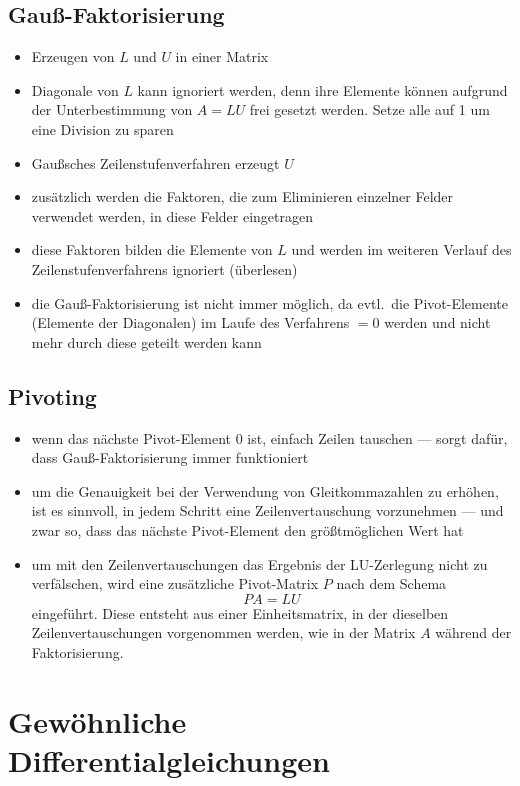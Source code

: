 \documentclass[a4paper, 12pt]{article}
\begin{document}
\subsection{Gauß-Faktorisierung}
\begin{itemize}
  \item Erzeugen von \(L\) und \(U\) in einer Matrix
  \item Diagonale von \(L\) kann ignoriert werden, denn ihre Elemente können aufgrund der Unterbestimmung von \(A=LU\) frei gesetzt werden. Setze alle auf 1 um eine Division zu sparen
  \item Gaußsches Zeilenstufenverfahren erzeugt \(U\)
  \item zusätzlich werden die Faktoren, die zum Eliminieren einzelner Felder verwendet werden, in diese Felder eingetragen
  \item diese Faktoren bilden die Elemente von \(L\) und werden im weiteren Verlauf des Zeilenstufenverfahrens ignoriert (überlesen)
  \item die Gauß-Faktorisierung ist nicht immer möglich, da evtl.\ die Pivot-Elemente (Elemente der Diagonalen) im Laufe des Verfahrens \(=0\) werden und nicht mehr durch diese geteilt werden kann
\end{itemize}


\subsection{Pivoting}
\begin{itemize}
  \item wenn das nächste Pivot-Element 0 ist, einfach Zeilen tauschen --- sorgt dafür, dass Gauß-Faktorisierung immer funktioniert
  \item um die Genauigkeit bei der Verwendung von Gleitkommazahlen zu erhöhen, ist es sinnvoll, in jedem Schritt eine Zeilenvertauschung vorzunehmen --- und zwar so, dass das nächste Pivot-Element den größtmöglichen Wert hat
  \item um mit den Zeilenvertauschungen das Ergebnis der LU-Zerlegung nicht zu verfälschen, wird eine zusätzliche Pivot-Matrix \(P\) nach dem Schema
    \[
    PA=LU
    \]
    eingeführt. Diese entsteht aus einer Einheitsmatrix, in der dieselben Zeilenvertauschungen vorgenommen werden, wie in der Matrix \(A\) während der Faktorisierung.
\end{itemize}



\section{Gewöhnliche Differentialgleichungen}
\end{document}
